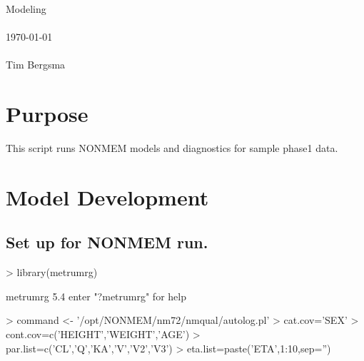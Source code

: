 
\usepackage{Sweave}

 

\vspace*{2cm}
\begin{center}
{\Large Modeling}\\
~\\
\today\\
~\\
Tim Bergsma\\
\end{center}
\newpage

\section{Purpose}
This script runs NONMEM models and diagnostics for sample phase1 data.
\section{Model Development}
\subsection{Set up for NONMEM run.}
\begin{Schunk}
\begin{Sinput}
> library(metrumrg)
\end{Sinput}
\begin{Soutput}
metrumrg 5.4 
enter "?metrumrg" for help
\end{Soutput}
\begin{Sinput}
> command <- '/opt/NONMEM/nm72/nmqual/autolog.pl'
> cat.cov='SEX'
> cont.cov=c('HEIGHT','WEIGHT','AGE')
> par.list=c('CL','Q','KA','V','V2','V3')
> eta.list=paste('ETA',1:10,sep='')
\end{Sinput}
\end{Schunk}
